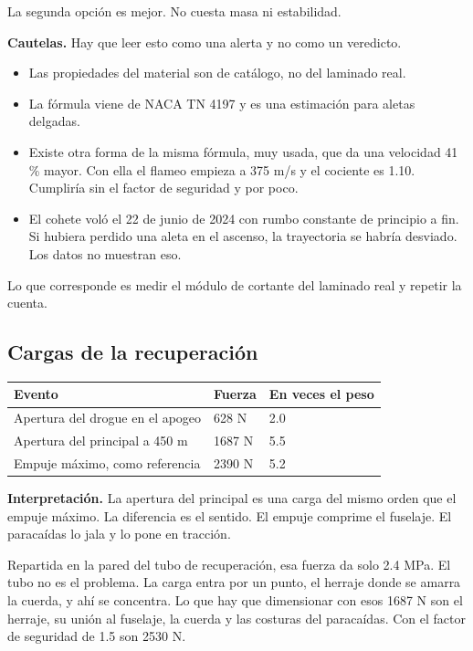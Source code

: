 La segunda opción es mejor. No cuesta masa ni estabilidad.

\textbf{Cautelas.} Hay que leer esto como una alerta y no
como un veredicto.

\begin{itemize}
\tightlist
\item
  Las propiedades del material son de catálogo, no del
  laminado real.
\item
  La fórmula viene de NACA TN 4197 y es una estimación para
  aletas delgadas.
\item
  Existe otra forma de la misma fórmula, muy usada, que da
  una velocidad 41 \% mayor. Con ella el flameo empieza a
  375 m/s y el cociente es 1.10. Cumpliría sin el factor de
  seguridad y por poco.
\item
  El cohete voló el 22 de junio de 2024 con rumbo constante
  de principio a fin. Si hubiera perdido una aleta en el
  ascenso, la trayectoria se habría desviado. Los datos no
  muestran eso.
\end{itemize}

Lo que corresponde es medir el módulo de cortante del
laminado real y repetir la cuenta.

\subsection{Cargas de la
recuperación}\label{cargas-de-la-recuperaciuxf3n}

{\def\LTcaptype{none} %
\begin{longtable}[]{@{}lll@{}}
\toprule\noalign{}
Evento & Fuerza & En veces el peso \\
\midrule\noalign{}
\endhead
\bottomrule\noalign{}
\endlastfoot
Apertura del drogue en el apogeo & 628 N & 2.0 \\
Apertura del principal a 450 m & 1687 N & 5.5 \\
Empuje máximo, como referencia & 2390 N & 5.2 \\
\end{longtable}
}

\textbf{Interpretación.} La apertura del principal es una
carga del mismo orden que el empuje máximo. La diferencia es
el sentido. El empuje comprime el fuselaje. El paracaídas lo
jala y lo pone en tracción.

Repartida en la pared del tubo de recuperación, esa fuerza
da solo 2.4 MPa. El tubo no es el problema. La carga entra
por un punto, el herraje donde se amarra la cuerda, y ahí se
concentra. Lo que hay que dimensionar con esos 1687 N son el
herraje, su unión al fuselaje, la cuerda y las costuras del
paracaídas. Con el factor de seguridad de 1.5 son 2530 N.


